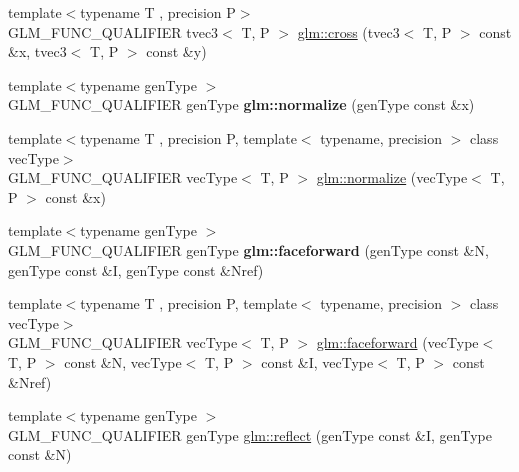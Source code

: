 \begin{DoxyCompactItemize}
\item 
{\footnotesize template$<$typename T , precision P$>$ }\\G\+L\+M\+\_\+\+F\+U\+N\+C\+\_\+\+Q\+U\+A\+L\+I\+F\+I\+ER tvec3$<$ T, P $>$ \hyperlink{group__core__func__geometric_gafe2cae8cb26fd44be62aee97369d0af8}{glm\+::cross} (tvec3$<$ T, P $>$ const \&x, tvec3$<$ T, P $>$ const \&y)
\item 
\mbox{\label{func__geometric_8inl_a213a489b64d438c533ea56f4cb2d2426}} 
{\footnotesize template$<$typename gen\+Type $>$ }\\G\+L\+M\+\_\+\+F\+U\+N\+C\+\_\+\+Q\+U\+A\+L\+I\+F\+I\+ER gen\+Type {\bfseries glm\+::normalize} (gen\+Type const \&x)
\item 
{\footnotesize template$<$typename T , precision P, template$<$ typename, precision $>$ class vec\+Type$>$ }\\G\+L\+M\+\_\+\+F\+U\+N\+C\+\_\+\+Q\+U\+A\+L\+I\+F\+I\+ER vec\+Type$<$ T, P $>$ \hyperlink{group__core__func__geometric_gada9451ec170a36fe53552812b9c03a68}{glm\+::normalize} (vec\+Type$<$ T, P $>$ const \&x)
\item 
\mbox{\label{func__geometric_8inl_ad32c7f0f9f0ca45467adbb4a1db5184d}} 
{\footnotesize template$<$typename gen\+Type $>$ }\\G\+L\+M\+\_\+\+F\+U\+N\+C\+\_\+\+Q\+U\+A\+L\+I\+F\+I\+ER gen\+Type {\bfseries glm\+::faceforward} (gen\+Type const \&N, gen\+Type const \&I, gen\+Type const \&Nref)
\item 
{\footnotesize template$<$typename T , precision P, template$<$ typename, precision $>$ class vec\+Type$>$ }\\G\+L\+M\+\_\+\+F\+U\+N\+C\+\_\+\+Q\+U\+A\+L\+I\+F\+I\+ER vec\+Type$<$ T, P $>$ \hyperlink{group__core__func__geometric_gaea854e5aec1b5839832ac2dfc7cd3c0d}{glm\+::faceforward} (vec\+Type$<$ T, P $>$ const \&N, vec\+Type$<$ T, P $>$ const \&I, vec\+Type$<$ T, P $>$ const \&Nref)
\item 
{\footnotesize template$<$typename gen\+Type $>$ }\\G\+L\+M\+\_\+\+F\+U\+N\+C\+\_\+\+Q\+U\+A\+L\+I\+F\+I\+ER gen\+Type \hyperlink{group__core__func__geometric_gab63646fc36b81cf69d3ce123a72f76f2}{glm\+::reflect} (gen\+Type const \&I, gen\+Type const \&N)
\item 
\mbox{\label{func__geometric_8inl_a7529009ea7fb6322ce0472f7d6a480e7}} 

\end{DoxyCompactItemize}
